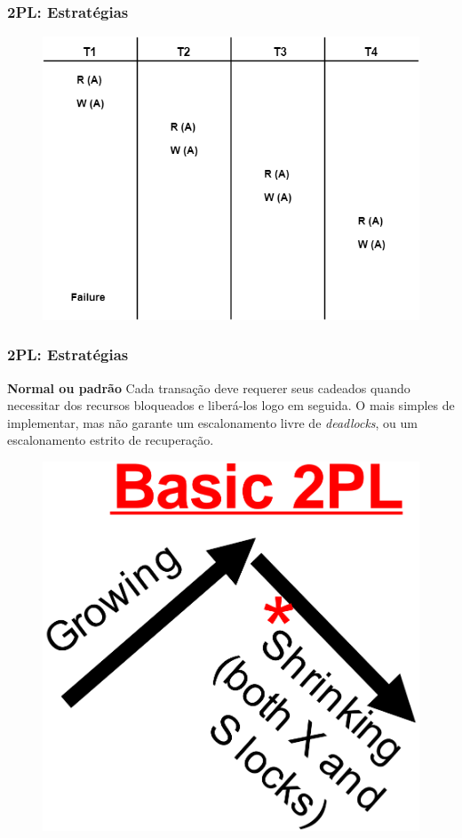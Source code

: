\documentclass{beamer}
\begin{document}
\begin{frame} %
    \frametitle{2PL: Estratégias}

    \begin{figure}
        \includegraphics[width=0.8\linewidth]{example9.png}
    \end{figure}
\end{frame}
    

\begin{frame} %
    \frametitle{2PL: Estratégias}
    \begin{block}{\textbf{Normal ou padrão}}
        Cada transação deve requerer seus cadeados quando necessitar dos recursos bloqueados e liberá-los logo em seguida. O mais simples de implementar, mas não garante um escalonamento livre de \emph{deadlocks}, ou um escalonamento estrito de recuperação.

        \begin{figure}
            \includegraphics[width=0.4\linewidth]{basic2pl.png}
        \end{figure}
    \end{block}
\end{frame}
\end{document}
